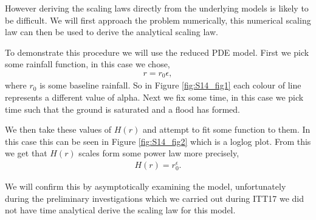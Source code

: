\documentclass[11pt]{article}
\begin{document}
\noindent\begin{minipage}{0.53\textwidth}
    \qquad However deriving the scaling laws directly from the underlying models is likely to be difficult. We will first approach the problem numerically, this numerical scaling law can then be used to derive the analytical scaling law.
    
    \qquad To demonstrate this procedure we will use the reduced PDE model. First we pick some rainfall function, in this case we chose, \begin{align}
        r = r_0\epsilon,
    \end{align}
    where $r_0$ is some baseline rainfall. So in Figure \ref{fig:S14_fig1} each colour of line represents a different value of alpha. Next we fix some time, in this case we pick time such that the ground is saturated and a flood has formed. 
    
    \qquad We then take these values of $H(r)$ and attempt to fit some function to them. In this case this can be seen in Figure \ref{fig:S14_fig2} which is a loglog plot. From this we get that $H(r)$ scales form some power law more precisely, \begin{align}
    H(r)=r_0^{\epsilon}.
    \end{align}
    
    \qquad We will confirm this by asymptotically examining the model, unfortunately during the preliminary investigations which we carried out during ITT17 we did not have time analytical derive the scaling law for this model.
    \end{minipage}
\hspace{0.05\textwidth}
\end{document}
